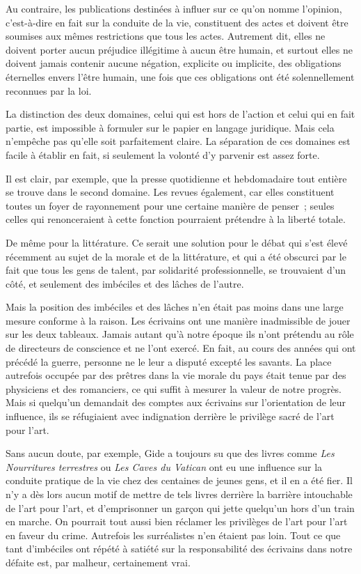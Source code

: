 \documentclass[french,twoside]{book} %
\begin{document}
Au contraire, les publications destinées à influer sur ce qu'on nomme l'opinion, c'est-à-dire en fait sur la conduite de la vie, constituent des actes et doivent être soumises aux mêmes restrictions que tous les actes. Autrement dit, elles ne doivent porter aucun préjudice illégitime à aucun être humain, et surtout elles ne doivent jamais contenir aucune négation, explicite ou implicite, des obligations éternelles envers l'être humain, une fois que ces obligations ont été solennellement reconnues par la loi.\par
La distinction des deux domaines, celui qui est hors de l'action et celui qui en fait partie, est impossible à formuler sur le papier en langage juridique. Mais cela n'empêche pas qu'elle soit parfaitement claire. La séparation de ces domaines est facile à établir en fait, si seulement la volonté d'y parvenir est assez forte.\par
Il est clair, par exemple, que la presse quotidienne et hebdomadaire tout entière se trouve dans le second domaine. Les revues également, car elles constituent toutes un foyer de rayonnement pour une certaine manière de penser ; seules celles qui renonceraient à cette fonction pourraient prétendre à la liberté totale.\par
De même pour la littérature. Ce serait une solution pour le débat qui s'est élevé récemment au sujet de la morale et de la littérature, et qui a été obscurci par le fait que tous les gens de talent, par solidarité professionnelle, se trouvaient d'un côté, et seulement des imbéciles et des lâches de l'autre.\par
Mais la position des imbéciles et des lâches n'en était pas moins dans une large mesure conforme à la raison. Les écrivains ont une manière inadmissible de jouer sur les deux tableaux. Jamais autant qu'à notre époque ils n'ont prétendu au rôle de directeurs de conscience et ne l'ont exercé. En fait, au cours des années qui ont précédé la guerre, personne ne le leur a disputé excepté les savants. La place autrefois occupée par des prêtres dans la vie morale du pays était tenue par des physiciens et des romanciers, ce qui suffit à mesurer la valeur de notre progrès. Mais si quelqu'un demandait des comptes aux écrivains sur l'orientation de leur influence, ils se réfugiaient avec indignation derrière le privilège sacré de l'art pour l'art.\par
Sans aucun doute, par exemple, Gide a toujours su que des livres comme {\itshape Les Nourritures terrestres} ou {\itshape Les Caves du Vatican} ont eu une influence sur la conduite pratique de la vie chez des centaines de jeunes gens, et il en a été fier. Il n'y a dès lors aucun motif de mettre de tels livres derrière la barrière intouchable de l'art pour l'art, et d'emprisonner un garçon qui jette quelqu'un hors d'un train en marche. On pourrait tout aussi bien réclamer les privilèges de l'art pour l'art en faveur du crime. Autrefois les surréalistes n'en étaient pas loin. Tout ce que tant d'imbéciles ont répété à satiété sur la responsabilité des écrivains dans notre défaite est, par malheur, certainement vrai.\par
\end{document}
